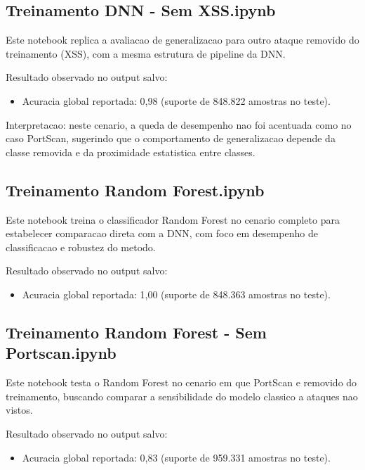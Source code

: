 \subsection{Treinamento DNN - Sem XSS.ipynb}

Este notebook replica a avaliacao de generalizacao para outro ataque removido do treinamento (XSS), com a mesma estrutura de pipeline da DNN.

Resultado observado no output salvo:
\begin{itemize}
\item Acuracia global reportada: 0,98 (suporte de 848.822 amostras no teste).
\end{itemize}

Interpretacao: neste cenario, a queda de desempenho nao foi acentuada como no caso PortScan, sugerindo que o comportamento de generalizacao depende da classe removida e da proximidade estatistica entre classes.


\subsection{Treinamento Random Forest.ipynb}

Este notebook treina o classificador Random Forest no cenario completo para estabelecer comparacao direta com a DNN, com foco em desempenho de classificacao e robustez do metodo.

Resultado observado no output salvo:
\begin{itemize}
\item Acuracia global reportada: 1,00 (suporte de 848.363 amostras no teste).
\end{itemize}


\subsection{Treinamento Random Forest - Sem Portscan.ipynb}

Este notebook testa o Random Forest no cenario em que PortScan e removido do treinamento, buscando comparar a sensibilidade do modelo classico a ataques nao vistos.

Resultado observado no output salvo:
\begin{itemize}
\item Acuracia global reportada: 0,83 (suporte de 959.331 amostras no teste).
\end{itemize}

